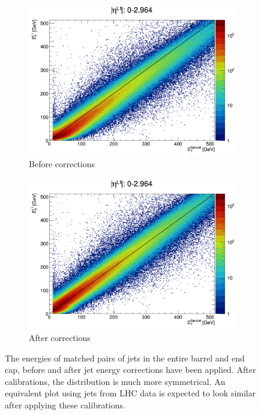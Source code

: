 \begin{figure}[htbp]
    \centering
    \begin{subfigure}[b]{0.45\textwidth}
        \includegraphics[width=\textwidth]{./figures/jecs/scatterPlotBeforeBE.png}
        \caption{Before corrections}
        \label{fig:detector_jecs_scatter_before_BE}
    \end{subfigure}
    \hfill
    \begin{subfigure}[b]{0.45\textwidth}
        \includegraphics[width=\textwidth]{./figures/jecs/scatterPlotAfterBE.png}
        \caption{After corrections}
        \label{fig:detector_jecs_scatter_after_BE}
    \end{subfigure}
\caption[The energies of matched pairs of jets in the entire barrel and end cap, before and after jet energy corrections have been applied]{The energies of matched pairs of jets in the entire barrel and end cap, before and after jet energy corrections have been applied. After calibrations, the distribution is much more symmetrical. An equivalent plot using jets from LHC data is expected to look similar after applying these calibrations.}
\label{fig:detector_jecs_scatter_BE}
\end{figure}
